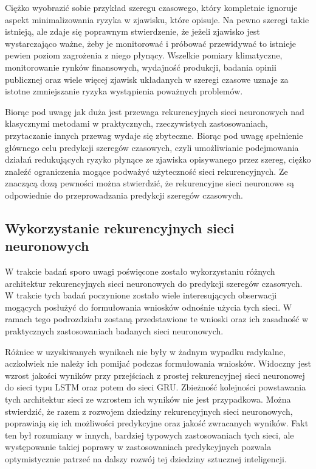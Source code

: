 \documentclass[10pt,a4paper]{article}
\begin{document}
Ciężko wyobrazić sobie przykład szeregu czasowego, który kompletnie ignoruje aspekt minimalizowania ryzyka w zjawisku, które opisuje. Na pewno szeregi takie istnieją, ale zdaje się poprawnym stwierdzenie, że jeżeli zjawisko jest wystarczająco ważne, żeby je monitorować i próbować przewidywać to istnieje pewien poziom zagrożenia z niego płynący. Wszelkie pomiary klimatyczne, monitorowanie rynków finansowych, wydajność produkcji, badania opinii publicznej oraz wiele więcej zjawisk układanych w szeregi czasowe uznaje za istotne zmniejszanie ryzyka wystąpienia poważnych problemów. 

Biorąc pod uwagę jak duża jest przewaga rekurencyjnych sieci neuronowych nad klasycznymi metodami w praktycznych, rzeczywistych zastosowaniach, przytaczanie innych przewag wydaje się zbyteczne. Biorąc pod uwagę spełnienie głównego celu predykcji szeregów czasowych, czyli umożliwianie podejmowania działań redukujących ryzyko płynące ze zjawiska opisywanego przez szereg, ciężko znaleźć ograniczenia mogące podważyć użyteczność sieci rekurencyjnych. Ze znaczącą dozą pewności można stwierdzić, że rekurencyjne sieci neuronowe są odpowiednie do przeprowadzania predykcji szeregów czasowych.

\subsection{Wykorzystanie rekurencyjnych sieci neuronowych}
W trakcie badań sporo uwagi poświęcone zostało wykorzystaniu różnych architektur rekurencyjnych sieci neuronowych do predykcji szeregów czasowych. W trakcie tych badań poczynione zostało wiele interesujących obserwacji mogących posłużyć do formułowania wniosków odnośnie użycia tych sieci. W ramach tego podrozdziału zostaną przedstawione te wnioski oraz ich zasadność w praktycznych zastosowaniach badanych sieci neuronowych. 

Różnice w uzyskiwanych wynikach nie były w żadnym wypadku radykalne, aczkolwiek nie należy ich pomijać podczas formułowania wniosków. Widoczny jest wzrost jakości wyników przy przejściach z prostej rekurencyjnej sieci neuronowej do sieci typu LSTM oraz potem do sieci GRU. Zbieżność kolejności powstawania tych architektur sieci ze wzrostem ich wyników nie jest przypadkowa. Można stwierdzić, że razem z rozwojem dziedziny rekurencyjnych sieci neuronowych, poprawiają się ich możliwości predykcyjne oraz jakość zwracanych wyników. Fakt ten był rozumiany w innych, bardziej typowych zastosowaniach tych sieci, ale występowanie takiej poprawy w zastosowaniach predykcyjnych pozwala optymistycznie patrzeć na dalszy rozwój tej dziedziny sztucznej inteligencji. 
\end{document}
